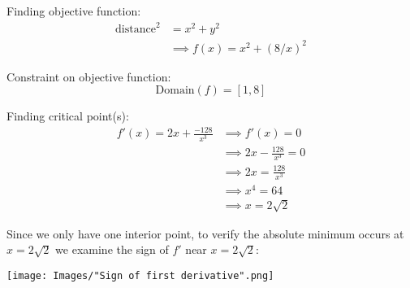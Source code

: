 \documentclass[handout, nooutcomes]{ximera}
\renewenvironment{freeResponse}{
\ifhandout\setbox0\vbox\bgroup\else
\begin{trivlist}\item[\hskip \labelsep\bfseries Solution:\hspace{2ex}]
\fi}
{\ifhandout\egroup\else
\end{trivlist}
\fi}
\begin{document}
\begin{problem}
\begin{itemize}
\begin{freeResponse}
        Finding objective function:
        \begin{align*}
          \text{distance}^2 &= x^2 + y^2 \\
          &\implies f(x) = x^2 + (8/x)^2
        \end{align*}

        Constraint on objective function:
        \[
          \text{Domain}(f) = [1, 8]
        \]

        Finding critical point(s):
        \begin{align*}
          f'(x) = 2x + \frac{-128}{x^3} &\implies f'(x) = 0 \\
          &\implies 2x - \frac{128}{x^3} = 0 \\
          &\implies 2x = \frac{128}{x^3} \\
          &\implies x^4 = 64 \\
          &\implies x = 2\sqrt{2}
        \end{align*}

        Since we only have one interior point, to verify the absolute minimum occurs at $x = 2\sqrt{2}$ we examine the sign of $f'$ near $x = 2\sqrt{2}$:
        \begin{image}
          \texttt{[image: Images/"Sign of first derivative".png]}
        \end{image}

      \end{freeResponse}
  \end{itemize}
\end{problem}
\end{document}
